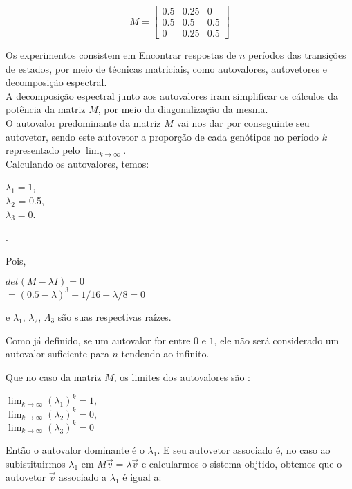 \documentclass[14pt]{article}
\begin{document}
\begin{displaymath}
M = \begin{bmatrix}
0.5&0.25&0\\
0.5&0.5&0.5\\
0&0.25&0.5
\end{bmatrix}
\end{displaymath}

Os experimentos consistem em Encontrar respostas de $n$ períodos das transições de estados, por meio de técnicas matriciais, como autovalores, autovetores e decomposição espectral.\\

A decomposição espectral junto aos autovalores iram simplificar os cálculos da potência da matriz $M$, por meio da diagonalização da mesma. \\

O autovalor predominante da matriz $M$ vai nos dar por conseguinte seu autovetor, sendo este autovetor a proporção de cada genótipos no período $k$ representado pelo $\lim_{k\to\infty}$.\\

Calculando os autovalores, temos:
\begin{center}
    $\lambda_1 = 1$,\\ $\lambda_2$ = 0.5,\\ $\lambda_3 = 0$.
\end{center}.

Pois,
\begin{center}
    $det(M-\lambda I) = 0$\\
    $= (0.5 - \lambda)^3 - 1/16 - \lambda/8 = 0$
\end{center}
e $\lambda_1$, $\lambda_2$, $\Lambda_3$ são suas respectivas raízes.

Como já definido, se um autovalor for entre $0$ e $1$, ele não será considerado um autovalor suficiente para $n$ tendendo ao infinito.

Que no caso da matriz $M$, os limites dos autovalores são :
\begin{center}
    $\lim_{k\to\infty} (\lambda_1)^k = 1$,\\
    $\lim_{k\to\infty} (\lambda_2)^k = 0$,\\
    $\lim_{k\to\infty} (\lambda_3)^k = 0$
\end{center}

Então o autovalor dominante é o $\lambda_1$. E seu autovetor associado é, no caso ao subistituirmos $\lambda_1$ em $M\vec{v} = \lambda \vec{v}$ e calcularmos o sistema objtido, obtemos que o autovetor $\vec{v}$ associado a $\lambda_1$ é igual a:
\end{document}

